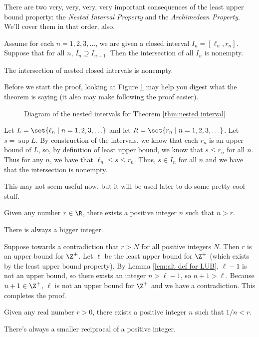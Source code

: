 \documentclass[class=article, crop=false]{standalone}
\begin{document}
There are two very, very, very, very important consequences of the least upper bound property: the \textit{Nested Interval Property} and the \textit{Archimedean Property}. We'll cover them in that order, also.
\begin{thm}{\label{thm:nested interval}}
    Assume for each $n=1,2,3,\ldots$, we are given a closed interval $I_n = [\ell_n, r_n]$. Suppose that for all $n$, $I_n \supseteq I_{n+1}$. Then the intersection of all $I_n$ is nonempty.
\end{thm}

\begin{slogan}
    The intersection of nested closed intervals is nonempty.
\end{slogan}

Before we start the proof, looking at Figure \ref{fig:nested interval} may help you digest what the theorem is saying (it also may make following the proof easier).
\begin{figure}[ht]
    \centering
    \caption{Diagram of the nested intervals for Theorem \ref{thm:nested interval}}
    \label{fig:nested interval}
\end{figure}

\begin{pf}
    Let $L = \set{\ell_n \mid n=1,2,3,\ldots}$ and let $R = \set{r_n \mid n=1,2,3,\ldots}$. Let $s = \sup L$. By construction of the intervals, we know that each $r_n$ is an upper bound of $L$, so, by definition of least upper bound, we know that $s \leq r_n$ for all $n$. Thus for any $n$, we have that $\ell_n \leq s \leq r_n$. Thus, $s \in I_n$ for all $n$ and we have that the intersection is nonempty.
\end{pf}

This may not seem useful now, but it will be used later to do some pretty cool stuff.
\begin{thm}{\label{thm:Achimedean Property}}
    Given any number $r \in \R$, there exists a positive integer $n$ such that $n > r$.
\end{thm}
\begin{slogan}
    There is always a bigger integer.
\end{slogan}

\begin{pf}
    Suppose towards a contradiction that $r > N$ for all positive integers $N$. Then $r$ is an upper bound for  $\Z^+$. Let $\ell$ be the least upper bound for $\Z^+$ (which exists by the least upper bound property). By Lemma \ref{lem:alt def for LUB}, $\ell-1$ is not an upper bound, so there exists an integer $n > \ell-1$, so $n+1 > \ell$. Because $n+1 \in \Z^+$, $\ell$ is not an upper bound for $\Z^+$ and we have a contradiction. This completes the proof.
\end{pf}
\begin{coro}
    Given any real number $r > 0$, there exists a positive integer $n$ such that $1/n < r$.
\end{coro}
\begin{slogan}
    There's always a smaller reciprocal of a positive integer.
\end{slogan}
\end{document}

